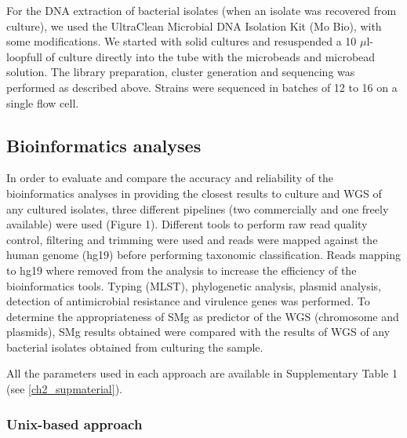 For the DNA extraction of bacterial isolates (when an isolate was recovered from culture), we used the UltraClean Microbial DNA Isolation Kit (Mo Bio), with some modifications. 
We started with solid cultures and resuspended a 10 $\mu$l-loopfull of culture directly into the tube with the microbeads and microbead solution. 
The library preparation, cluster generation and sequencing was performed as described above. 
Strains were sequenced in batches of 12 to 16 on a single flow cell.

\subsection{Bioinformatics analyses} \label{ssec:sample_bioinformatics}

In order to evaluate and compare the accuracy and reliability of the bioinformatics analyses in providing the closest results to culture and WGS of any cultured isolates, three different pipelines (two commercially and one freely available) were used (Figure 1).
Different tools to perform raw read quality control, filtering and trimming were used and reads were mapped against the human genome (hg19) before performing taxonomic classification. 
Reads mapping to hg19 where removed from the analysis to increase the efficiency of the bioinformatics tools. 
Typing (MLST), phylogenetic analysis, plasmid analysis, detection of antimicrobial resistance and virulence genes was performed. 
To determine the appropriateness of SMg as predictor of the WGS (chromosome and plasmids), SMg results obtained were compared with the results of WGS of any bacterial isolates obtained from culturing the sample.

All the parameters used in each approach are available in Supplementary Table 1 (see \ref{ch2_supmaterial}).

\subsubsection{Unix-based approach}

